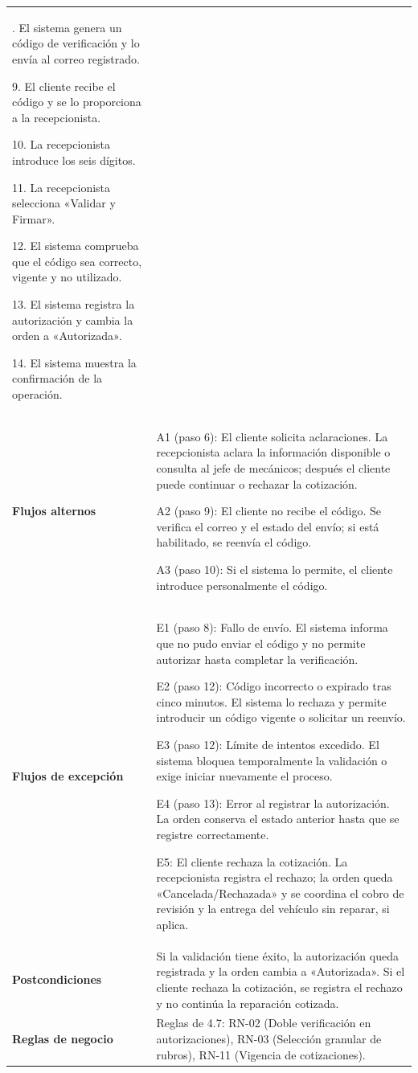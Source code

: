 {\begin{longtable}[]{@{}
  >{\raggedright\arraybackslash}p{}
  >{\raggedright\arraybackslash}p{}@{}}
8. El sistema genera un código de verificación y lo envía al correo
registrado.

9. El cliente recibe el código y se lo proporciona a la recepcionista.

10. La recepcionista introduce los seis dígitos.

11. La recepcionista selecciona «Validar y Firmar».

12. El sistema comprueba que el código sea correcto, vigente y no
utilizado.

13. El sistema registra la autorización y cambia la orden a
«Autorizada».

14. El sistema muestra la confirmación de la operación. \\
\textbf{Flujos alternos} & A1 (paso 6): El cliente solicita
aclaraciones. La recepcionista aclara la información disponible o
consulta al jefe de mecánicos; después el cliente puede continuar o
rechazar la cotización.

A2 (paso 9): El cliente no recibe el código. Se verifica el correo y el
estado del envío; si está habilitado, se reenvía el código.

A3 (paso 10): Si el sistema lo permite, el cliente introduce
personalmente el código. \\
\textbf{Flujos de excepción} & E1 (paso 8): Fallo de envío. El sistema
informa que no pudo enviar el código y no permite autorizar hasta
completar la verificación.

E2 (paso 12): Código incorrecto o expirado tras cinco minutos. El
sistema lo rechaza y permite introducir un código vigente o solicitar un
reenvío.

E3 (paso 12): Límite de intentos excedido. El sistema bloquea
temporalmente la validación o exige iniciar nuevamente el proceso.

E4 (paso 13): Error al registrar la autorización. La orden conserva el
estado anterior hasta que se registre correctamente.

E5: El cliente rechaza la cotización. La recepcionista registra el
rechazo; la orden queda «Cancelada/Rechazada» y se coordina el cobro de
revisión y la entrega del vehículo sin reparar, si aplica. \\
\textbf{Postcondiciones} & Si la validación tiene éxito, la autorización
queda registrada y la orden cambia a «Autorizada». Si el cliente rechaza
la cotización, se registra el rechazo y no continúa la reparación
cotizada. \\
\textbf{Reglas de negocio} & Reglas de 4.7: RN-02 (Doble verificación en
autorizaciones), RN-03 (Selección granular de rubros), RN-11 (Vigencia
de cotizaciones).


\end{longtable}}
